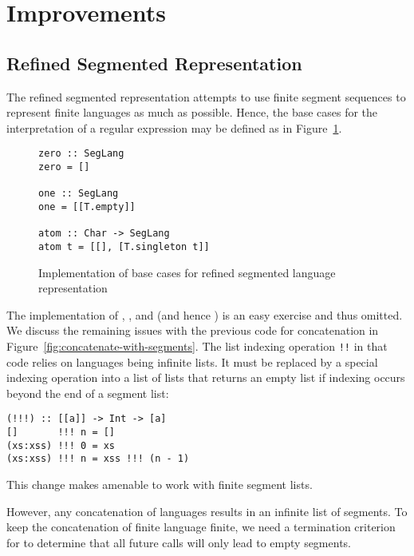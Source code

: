 \section{Improvements}
\label{sec:improvements}

\subsection{Refined Segmented Representation}
\label{sec:segm-repr}

The refined segmented representation attempts to use finite segment sequences to represent finite languages as much as possible. Hence, the
base cases for the interpretation of a regular expression may be defined
as in Figure~\ref{fig:base-cases-segmented}.
\begin{figure}[tp]
\begin{lstlisting}
zero :: SegLang
zero = []

one :: SegLang
one = [[T.empty]]

atom :: Char -> SegLang
atom t = [[], [T.singleton t]]
\end{lstlisting}
  \caption{Implementation of base cases for refined segmented language representation}
  \label{fig:base-cases-segmented}
\end{figure}
The implementation of , , and
 (and hence ) is an easy exercise and thus omitted.
We discuss the remaining issues with the previous code for concatenation in
Figure~\ref{fig:concatenate-with-segments}. 
The list indexing operation \lstinline{!!} in that code relies on languages being infinite lists. 
It must be replaced by a special indexing operation into a list of lists that returns an empty
list if indexing occurs beyond the end of a segment list:
\begin{lstlisting}
(!!!) :: [[a]] -> Int -> [a]
[]       !!! n = []
(xs:xss) !!! 0 = xs
(xs:xss) !!! n = xss !!! (n - 1)
\end{lstlisting}
This change makes  amenable to work with finite
segment lists. 

However, any concatenation of languages results in an infinite list of
segments. To keep the concatenation of finite language finite, we need
a termination criterion for  to determine that all
future calls will only lead to empty segments.

